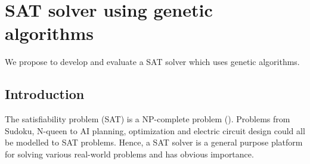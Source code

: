 \documentclass[../proposal.tex]{subfiles}
\begin{document}
\section{SAT solver using genetic algorithms}
We propose to develop and evaluate a SAT solver which uses genetic algorithms.

\subsection{Introduction}
The satisfiability problem (SAT) is a NP-complete problem
(\cite{cook_1971}). Problems from Sudoku, N-queen to AI planning,
optimization and electric circuit design could all be modelled to SAT problems.
Hence, a SAT solver is a general purpose platform for solving various
real-world problems and has obvious importance.
\end{document}
